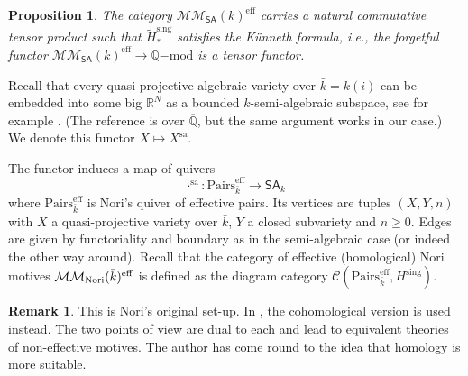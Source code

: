 \documentclass[11pt,a4paper]{amsart}
\newtheorem{prop}[lemma]{Proposition}
\theoremstyle{definition}
\newtheorem{rem}[lemma]{Remark}
\newcommand{\MMN}{\mathcal{MM}_{\rm Nori}}
\newcommand{\MMSA}{\mathcal{MM}_{\SA}}
\newcommand{\Ch}{\mathcal{C}}
\newcommand{\eff}{\mathrm{eff}}
\newcommand{\Qmod}{\Q\mathrm{-mod}}
\newcommand{\sa}{\mathrm{sa}}
\newcommand{\sing}{\mathrm{sing}}
\newcommand{\Hsing}{H^\sing}
\newcommand{\Hsingtilde}{\tilde{H}^\sing}
\newcommand{\pairs}{\mathrm{Pairs}}
\newcommand{\SA}{\mathsf{SA}}
\newcommand{\GSA}{\mathsf{GSA}}
\newcommand{\pairseff}{\pairs^\eff}
\newcommand{\Q}{\mathbb{Q}}
\newcommand{\Qbar}{{\overline{\Q}}}
\newcommand{\R}{\mathbb{R}}
\begin{document}
\begin{prop}
The category $\MMSA(k)^\eff$ carries a natural commutative tensor product such that $\Hsingtilde_*$ satisfies the K\"unneth formula, i.e., the forgetful functor
$\MMSA(k)^\eff\to\Qmod$ is a tensor functor.
\end{prop}





Recall that every quasi-projective algebraic variety over $\bar{k}=k(i)$ can be embedded into some big $\R^N$ as a bounded $k$-semi-algebraic subspace, see for example \cite[Lemma~2.6.6]{period-buch}. (The reference is over
$\Qbar$, but the same argument works in our case.) 
We denote this functor $X\mapsto X^\sa$.


The functor  induces a map of quivers
\[ \cdot^\sa:\pairseff_{\bar{k}}\to \SA_k\]
where $\pairseff_{\bar{k}}$ is Nori's quiver of effective pairs. Its vertices
are tuples $(X,Y,n)$ with $X$ a quasi-projective variety over $\bar{k}$, $Y$ a closed subvariety and $n\geq 0$. Edges are given by functoriality and boundary as in the semi-algebraic case (or indeed the other way around).
Recall that the category of effective (homological) Nori motives $\MMN(\bar{k})^\eff$ is defined
as the diagram category $\Ch(\pairs^\eff_{\bar{k}},\Hsing)$.

\begin{rem}This is Nori's original set-up. In \cite{period-buch}, the cohomological version is used instead.
The two points of view are dual to each and lead to equivalent theories of non-effective motives.
The author has come round to the idea that homology is more suitable.
\end{rem}
\end{document}
